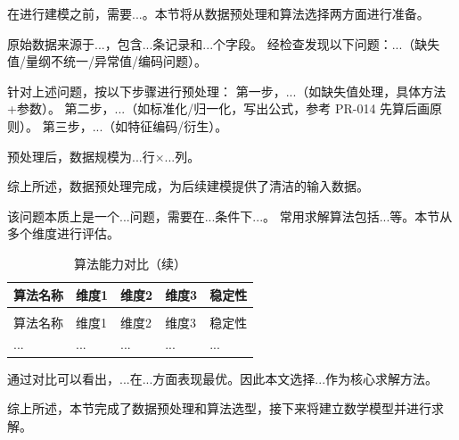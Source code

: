 在进行建模之前，需要...。本节将从数据预处理和算法选择两方面进行准备。

原始数据来源于...，包含...条记录和...个字段。
经检查发现以下问题：...（缺失值/量纲不统一/异常值/编码问题）。

针对上述问题，按以下步骤进行预处理：
第一步，...（如缺失值处理，具体方法+参数）。
第二步，...（如标准化/归一化，写出公式，参考 PR-014 先算后画原则）。
第三步，...（如特征编码/衍生）。

预处理后，数据规模为...行×...列。

综上所述，数据预处理完成，为后续建模提供了清洁的输入数据。

该问题本质上是一个...问题，需要在...条件下...。
常用求解算法包括...等。本节从多个维度进行评估。

\begin{longtable}{>{\centering\arraybackslash}p{}>{\centering\arraybackslash}p{}>{\centering\arraybackslash}p{}>{\centering\arraybackslash}p{}>{\centering\arraybackslash}p{}}
  \caption{算法能力对比}
  \label{tab:算法对比1} \\
  \toprule
  算法名称 & 维度1 & 维度2 & 维度3 & 稳定性 \\
  \midrule
  \endfirsthead
  \caption{算法能力对比（续）} \\
  \toprule
  算法名称 & 维度1 & 维度2 & 维度3 & 稳定性 \\
  \midrule
  \endhead
  \bottomrule
  \endfoot
  ... & ... & ... & ... & ... \\
\end{longtable}

通过对比可以看出，...在...方面表现最优。因此本文选择...作为核心求解方法。

综上所述，本节完成了数据预处理和算法选型，接下来将建立数学模型并进行求解。
